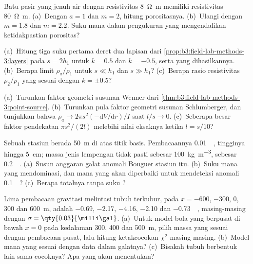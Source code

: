 \begin{exercise}[$\star\star$]\label{exo:b3:field-lab-methods-3:8}
Batu pasir yang jenuh air dengan resistivitas \qty{8}{\ohm\metre} memiliki
resistivitas \qty{80}{\ohm\metre}. (a)~Dengan $a = 1$ dan $m = 2$,
hitung porositasnya. (b)~Ulangi dengan $m = 1.8$ dan $m = 2.2$. Suku
mana dalam pengukuran yang mengendalikan ketidakpastian porositas?
\end{exercise}

\begin{exercise}[$\star\star$]\label{exo:b3:field-lab-methods-3:9}
(a)~Hitung tiga suku pertama deret dua lapisan dari
\cref{prop:b3:field-lab-methods-3:layers} pada $s = 2h_1$ untuk $k =
\num{0.5}$ dan $k = \num{-0.5}$, serta  yang
dihasilkannya. (b)~Berapa limit $\rho_a/\rho_1$ untuk $s \ll h_1$ dan
$s \gg h_1$? (c)~Berapa rasio resistivitas $\rho_2/\rho_1$ yang sesuai dengan
$k = \pm 0.5$?
\end{exercise}

\begin{exercise}[$\star\star\star$]\label{exo:b3:field-lab-methods-3:10}
(a)~Turunkan faktor geometri susunan Wenner dari
\cref{thm:b3:field-lab-methods-3:point-source}. (b)~Turunkan pula faktor geometri
susunan Schlumberger, dan tunjukkan bahwa $\rho_a \to 2\pi s^2(-\mathrm{d}V/
\mathrm{d}r)/I$ saat $l/s \to 0$. (c)~Seberapa besar faktor pendekatan
$\pi s^2/(2l)$ melebihi nilai eksaknya ketika $l = s/10$?
\end{exercise}

\begin{exercise}[$\star\star\star$]\label{exo:b3:field-lab-methods-3:11}
Sebuah stasiun berada \qty{50}{m} di atas titik basis. Pembacaannya
\qty{0.01}{\milli\gal}, tingginya hingga \qty{5}{cm}; massa jenis
lempengan tidak pasti sebesar \qty{100}{kg.m^{-3}},  sebesar
\qty{0.2}{\milli\gal}. (a)~Susun anggaran galat anomali Bouguer
stasiun itu. (b)~Suku mana yang mendominasi, dan mana yang akan diperbaiki
untuk mendeteksi anomali \qty{0.1}{\milli\gal}? (c)~Berapa totalnya tanpa
suku ?
\end{exercise}

\begin{exercise}[$\star\star\star$]\label{exo:b3:field-lab-methods-3:12}
Lima pembacaan gravitasi melintasi tubuh terkubur, pada $x = -600$, $-300$, $0$,
$300$ dan \qty{600}{m}, adalah \num{-0.69}, \num{-2.17}, \num{-4.16},
\num{-2.10} dan \qty{-0.73}{\milli\gal}, masing-masing dengan $\sigma =
\qty{0.03}{\milli\gal}$. (a)~Untuk model bola yang berpusat di bawah $x = 0$ pada
kedalaman \num{300}, \num{400} dan \qty{500}{m}, pilih massa yang
sesuai dengan pembacaan pusat, lalu hitung ketakcocokan $\chi^2$ masing-masing. (b)~Model mana
yang sesuai dengan data dalam galatnya? (c)~Bisakah tubuh berbentuk lain
sama cocoknya? Apa yang akan menentukan?
\end{exercise}

